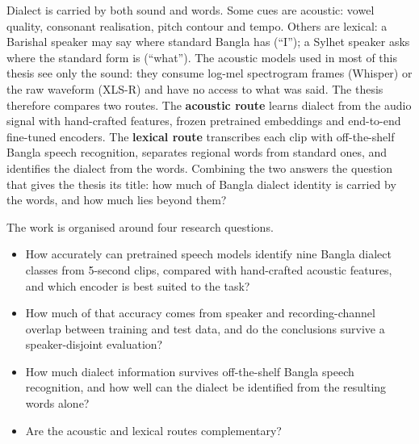 Dialect is carried by both sound and words. Some cues are acoustic: vowel
quality, consonant realisation, pitch contour and tempo. Others are lexical: a
Barishal speaker may say  where standard Bangla has 
(``I''); a Sylhet speaker asks  where the standard form is
 (``what''). The acoustic models used in most of this thesis see only
the sound: they consume log-mel spectrogram frames (Whisper) or the raw waveform
(XLS-R) and have no access to what was said. The thesis therefore compares two
routes. The \textbf{acoustic route} learns dialect from the audio signal with
hand-crafted features, frozen pretrained embeddings and end-to-end fine-tuned
encoders. The \textbf{lexical route} transcribes each clip with off-the-shelf
Bangla speech recognition, separates regional words from standard ones, and
identifies the dialect from the words. Combining the two answers the question
that gives the thesis its title: how much of Bangla dialect identity is carried
by the words, and how much lies beyond them?

The work is organised around four research questions.
\begin{itemize}[leftmargin=3.2em,labelsep=0.6em,itemsep=4pt]
  \item[\textbf{RQ1}] How accurately can pretrained speech models identify nine
        Bangla dialect classes from 5-second clips, compared with hand-crafted
        acoustic features, and which encoder is best suited to the task?
  \item[\textbf{RQ2}] How much of that accuracy comes from speaker and
        recording-channel overlap between training and test data, and do the
        conclusions survive a speaker-disjoint evaluation?
  \item[\textbf{RQ3}] How much dialect information survives off-the-shelf
        Bangla speech recognition, and how well can the dialect be identified
        from the resulting words alone?
  \item[\textbf{RQ4}] Are the acoustic and lexical routes complementary?
\end{itemize}

